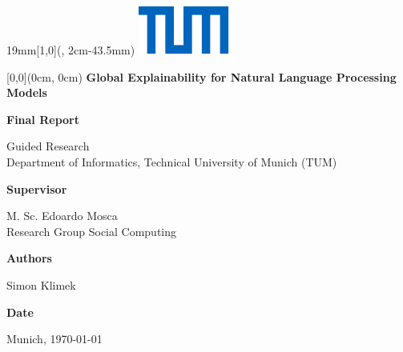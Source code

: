 \documentclass[11pt]{article} %
\newcommand{\Titel}{%
    Global Explainability for Natural Language
Processing Models}
\newcommand{\Untertitel}{%
    Final Report}
\newcommand{\Grad}{%
    Guided Research}
\newcommand{\BetreutVonPerson}{%
    M. Sc. Edoardo Mosca}
\newcommand{\BetreutVonLehrstuhl}{%
    Research Group Social Computing}
\newcommand{\EingereichtVon}{%
    Simon Klimek}
\newcommand{\Datum}{%
    \today}
\newcommand{\SeitenrandOben}{43.5mm}
\newcommand{\UniversitaetLogoBreite}{19mm}
\begin{document}
\begin{textblock*}{\UniversitaetLogoBreite}[1,0](\textwidth-1mm, 2cm-\SeitenrandOben)%
    \raggedleft\includegraphics{./Universitaet_Logo_RGB.pdf}%
\end{textblock*}


\begin{textblock*}{\textwidth}[0,0](0cm, 0cm)%
{\fontsize{24pt}{26pt}\selectfont\textbf{\Titel}}

\vspace*{14pt}
{\fontsize{18pt}{27pt}\selectfont\textbf{\Untertitel}}
\end{textblock*}

\vspace*{92.2mm}
\fontsize{15pt}{17.5pt}\selectfont%
\Grad\\
Department of Informatics, Technical University of Munich (TUM)

\renewcommand{\baselinestretch}{1.47}
\normalsize\selectfont
\vspace*{17.1mm}
\textbf{Supervisor}\tab
\begin{minipage}[t]{\textwidth-\CurrentLineWidth}
\BetreutVonPerson\\
\BetreutVonLehrstuhl\strut
\end{minipage}

\vspace*{4.3mm}
\textbf{Authors}\tab
\begin{minipage}[t]{\textwidth-\CurrentLineWidth}
\EingereichtVon
\end{minipage}

\vspace*{-1mm}
\textbf{Date}\tab 
\begin{minipage}[t]{\textwidth-\CurrentLineWidth}
Munich, \Datum\strut
\end{minipage}





\end{document}
